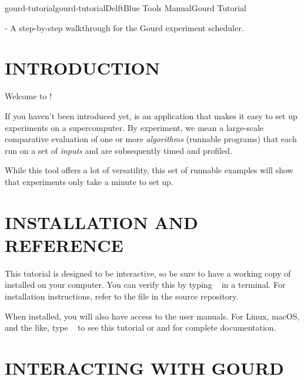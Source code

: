 \documentclass[a4paper,english]{article}
\begin{document}
    \pagestyle{fancy}

    \begin{Name}{7}{gourd-tutorial}{gourd-tutorial}{DelftBlue Tools Manual}{Gourd Tutorial}
\begin{adjustwidth}{18pt}{0pt}

         - A step-by-step walkthrough for the Gourd experiment scheduler.

\end{adjustwidth}
    \end{Name}

\begin{adjustwidth}{18pt}{0pt}

    \section{INTRODUCTION}

    Welcome to !

    If you haven't been introduced yet,  is an application
    that makes it easy to set up experiments on a supercomputer.
    By experiment, we mean a large-scale comparative evaluation of one or
    more \emph{algorithms} (runnable programs) that each run on a set of
    \emph{inputs} and are subsequently timed and profiled.

    While this tool offers a lot of versatility, this set of runnable
    examples will show that  experiments only take a minute to
    set up.

    \section{INSTALLATION AND REFERENCE}

    This tutorial is designed to be interactive, so be sure to have a working copy of
     installed on your computer.
    You can verify this by typing ~ in a terminal.
    For installation instructions, refer to the  file in the
    source repository.

    When installed, you will also have access to the user manuals.
    For Linux, macOS, and the like, type ~ to
    see this tutorial or  and  for complete
    documentation.

    \section{INTERACTING WITH GOURD}


\end{adjustwidth}
\end{document}
